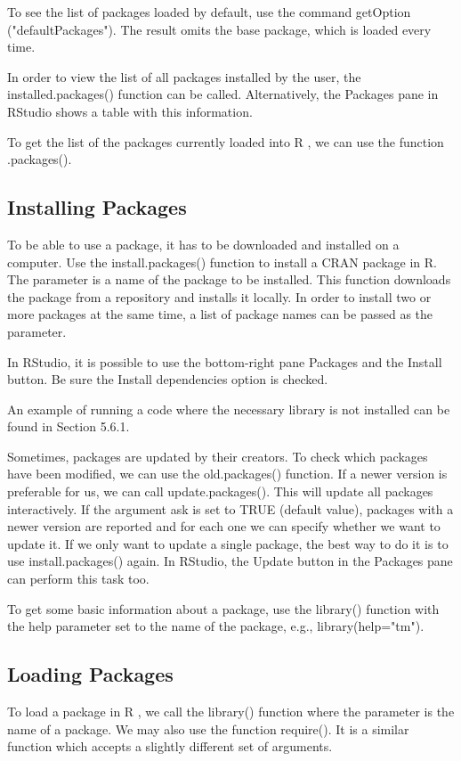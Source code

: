 \documentclass[11pt,openany,executivepaper]{book}
\begin{document}
To see the list of packages loaded by default, use the command getOption ("defaultPackages"). The result omits the base package, which is loaded every time.

In order to view the list of all packages installed by the user, the installed.packages() function can be called. Alternatively, the Packages pane in RStudio shows a table with this information.

To get the list of the packages currently loaded into R , we can use the function .packages().

\subsection{Installing Packages}
To be able to use a package, it has to be downloaded and installed on a computer. Use the install.packages() function to install a CRAN package in R. The parameter is a name of the package to be installed. This function downloads the package from a repository and installs it locally. In order to install two or more packages at the same time, a list of package names can be passed as the parameter.

In RStudio, it is possible to use the bottom-right pane Packages and the Install button. Be sure the Install dependencies option is checked.

An example of running a code where the necessary library is not installed can be found in Section 5.6.1.

Sometimes, packages are updated by their creators. To check which packages have been modified, we can use the old.packages() function. If a newer version is preferable for us, we can call update.packages(). This will update all packages interactively. If the argument ask is set to TRUE (default value), packages with a newer version are reported and for each one we can specify whether we want to update it. If we only want to update a single package, the best way to do it is to use install.packages() again. In RStudio, the Update button in the Packages pane can perform this task too.

To get some basic information about a package, use the library() function with the help parameter set to the name of the package, e.g., library(help="\-tm").

\subsection{Loading Packages}
To load a package in R , we call the library() function where the parameter is the name of a package. We may also use the function require(). It is a similar function which accepts a slightly different set of arguments.
\end{document}
